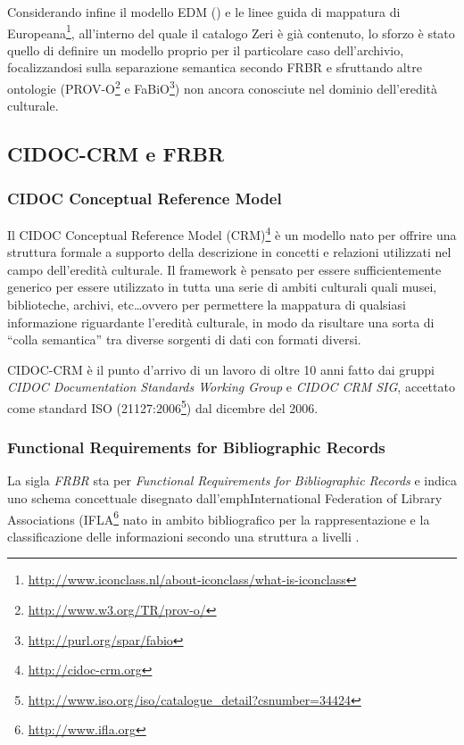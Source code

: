 Considerando infine il modello EDM (\cite{11}) e le linee guida di mappatura di Europeana\footnote{\url{http://www.iconclass.nl/about-iconclass/what-is-iconclass}}, all'interno del quale il catalogo Zeri è già contenuto, lo sforzo è stato quello di definire un modello proprio per il particolare caso dell'archivio, focalizzandosi sulla separazione semantica secondo FRBR e sfruttando altre ontologie (PROV-O\footnote{\url{http://www.w3.org/TR/prov-o/}} e FaBiO\footnote{\url{http://purl.org/spar/fabio}}) non ancora conosciute nel dominio dell'eredità culturale.

\subsection{CIDOC-CRM e FRBR}

\subsubsection{CIDOC Conceptual Reference Model}
Il CIDOC Conceptual Reference Model (CRM)\footnote{\url{http://cidoc-crm.org}} è un modello nato per offrire una struttura formale a supporto della descrizione in concetti e relazioni utilizzati nel campo dell'eredità culturale. Il framework è pensato per essere sufficientemente generico per essere utilizzato in tutta una serie di ambiti culturali quali musei, biblioteche, archivi, etc\dots ovvero per permettere la mappatura di qualsiasi informazione riguardante l'eredità culturale, in modo da risultare una sorta di ``colla semantica'' tra diverse sorgenti di dati con formati diversi.

CIDOC-CRM è il punto d'arrivo di un lavoro di oltre 10 anni fatto dai gruppi \emph{CIDOC Documentation Standards Working Group} e \emph{CIDOC CRM SIG}, accettato come standard ISO (21127:2006\footnote{\url{http://www.iso.org/iso/catalogue_detail?csnumber=34424}}) dal dicembre del 2006.

\subsubsection{Functional Requirements for Bibliographic Records}

La sigla \emph{FRBR} sta per \emph{Functional Requirements for Bibliographic Records} e indica uno schema concettuale disegnato dall'emph{International Federation of Library Associations} (IFLA\footnote{\url{http://www.ifla.org}} nato in ambito bibliografico per la rappresentazione e la classificazione delle informazioni secondo una struttura a livelli \cite{19}.

